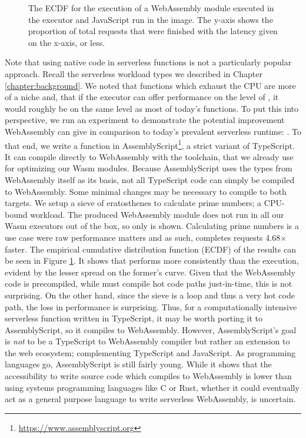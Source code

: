 \begin{figure}
    \begin{center}
        
    \end{center}
    \caption{The ECDF for the execution of a WebAssembly module executed in the  executor and JavaScript run in the  image. The y-axis shows the proportion of total requests that were finished with the latency given on the x-axis, or less.}
    \label{fig:pc-load-prime}
\end{figure}

Note that using native code in serverless functions is not a particularly popular approach. Recall the serverless workload types we described in Chapter \ref{chapter:background}. We noted that functions which exhaust the CPU are more of a niche and, that if the executor can offer performance on the level of , it would roughly be on the same level as most of today's functions.
To put this into perspective, we run an experiment to demonstrate the potential improvement WebAssembly can give in comparison to today's prevalent serverless runtime: .
To that end, we write a function in AssemblyScript\footnote{\url{https://www.assemblyscript.org}}, a strict variant of TypeScript. It can compile directly to WebAssembly with the  toolchain, that we already use for optimizing our Wasm modules. Because AssemblyScript uses the types from WebAssembly itself as its basis, not all TypeScript code can simply be compiled to WebAssembly. Some minimal changes may be necessary to compile to both targets. We setup a sieve of eratosthenes to calculate prime numbers; a CPU-bound workload. The produced WebAssembly module does not run in all our Wasm executors out of the box, so only  is shown. Calculating prime numbers is a use case were raw performance matters and as such,  completes requests 4.68$\times$ faster. The empirical cumulative distribution function (ECDF) of the results can be seen in Figure \ref{fig:pc-load-prime}. It shows that  performs more consistently than the  execution, evident by the lesser spread on the former's curve. Given that the WebAssembly code is precompiled, while  must compile hot code paths just-in-time, this is not surprising. On the other hand, since the sieve is a loop and thus a very hot code path, the loss in performance is surprising.
Thus, for a computationally intensive serverless function written in TypeScript, it may be worth porting it to AssemblyScript, so it compiles to WebAssembly. However, AssemblyScript's goal is \emph{not} to be a TypeScript to WebAssembly compiler but rather an extension to the web ecosystem; complementing TypeScript and JavaScript. As programming languages go, AssemblyScript is still fairly young. While it shows that the accessibility to write source code which compiles to WebAssembly is lower than using systems programming languages like C or Rust, whether it could eventually act as a general purpose language to write serverless WebAssembly, is uncertain.


